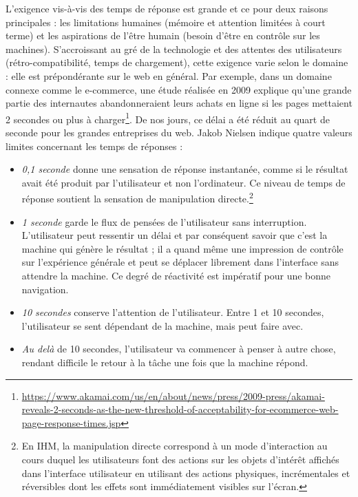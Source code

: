 L'exigence vis-à-vis des temps de réponse est  
grande et ce pour deux raisons principales : les limitations humaines (mémoire et 
attention limitées 
à court terme) et les aspirations de l'être humain (besoin d'être en contrôle sur les 
machines). S'accroissant au gré de la technologie et des attentes des 
utilisateurs (rétro-compatibilité, temps de 
chargement), cette exigence varie selon le domaine : elle est prépondérante sur le 
web en général. 
Par exemple, dans un domaine connexe comme le e-commerce, une étude réalisée 
en 2009 explique qu’une grande partie des internautes abandonneraient leurs achats 
en ligne si les pages mettaient 2 secondes ou plus à charger\footnote{\url{https://www.akamai.com/us/en/about/news/press/2009-press/akamai-reveals-2-seconds-as-the-new-threshold-of-acceptability-for-ecommerce-web-page-response-times.jsp}}. De nos jours, ce 
délai a été réduit au quart de seconde pour les grandes entreprises du web. Jakob 
Nielsen \cite{Nielsen1993a} indique quatre valeurs limites concernant les 
temps de réponses :
\begin{itemize}
	\item \textit{0,1 seconde} donne une sensation de réponse instantanée, comme 
	si le 
	résultat avait été produit par l'utilisateur et non l'ordinateur. Ce niveau de temps 
	de réponse soutient la sensation de manipulation directe.\footnote{En IHM, la 
		manipulation directe correspond à un mode d'interaction au cours duquel les 
		utilisateurs font des actions sur les objets d'intérêt affichés dans l'interface 
		utilisateur en utilisant des actions physiques, incrémentales et réversibles 
		dont 
		les effets sont immédiatement visibles sur l'écran.} 
	\item \textit{1 seconde} garde le flux de pensées de l'utilisateur sans 
	interruption. 
	L'utilisateur peut ressentir un délai et par conséquent savoir que c'est la 
	machine qui génère le résultat ; il a quand même une impression de 
	contrôle sur l'expérience générale et peut se déplacer librement dans l'interface 
	sans attendre la machine. Ce degré de réactivité est impératif pour une bonne 
	navigation.
	\item \textit{10 secondes} conserve l'attention de l'utilisateur. Entre 1 et 10 
	secondes, l'utilisateur se sent dépendant de la machine, mais peut faire avec. 
	\item \textit{Au delà} de 10 secondes, l'utilisateur va commencer à penser à autre chose, rendant difficile 
	le retour à la tâche une fois que la machine répond.
\end{itemize} 
